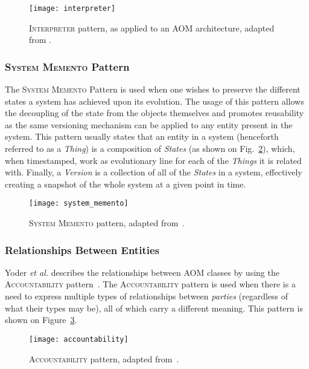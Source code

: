 \begin{figure}[H]
  \centering
  \texttt{[image: interpreter]}
  \caption{\textsc{Interpreter} pattern, as applied to an AOM architecture, adapted from \cite{gang_of_four}.}
  \label{fig:interpreter_pattern}
\end{figure}

\subsubsection{\textsc{System Memento} Pattern}\label{sec:system_memento_pattern}

The \textsc{System Memento} Pattern is used when one wishes to preserve the different states a system has achieved upon its evolution. The usage of this pattern allows the decoupling of the state from the objects themselves and promotes reusability as the same versioning mechanism can be applied to any entity present in the system. This pattern usually states that an entity in a system (henceforth referred to as a \emph{Thing}) is a composition of \emph{States} (as shown on Fig.~\ref{fig:system_memento}), which, when timestamped, work as evolutionary line for each of the \emph{Things} it is related with. Finally, a \emph{Version} is a collection of all of the \emph{States} in a system, effectively creating a snapshot of the whole system at a given point in time.

\begin{figure}[H]
  \centering
  \texttt{[image: system\_memento]}
  \caption{\textsc{System Memento} pattern, adapted from~\cite{patterns_data_and_metadata_evolution_in_aoms}.}
  \label{fig:system_memento}
\end{figure}

\subsubsection{Relationships Between Entities}\label{sec:relationships_between_entities}

Yoder \textit{et al.}\cite{YJ02} describes the relationships between AOM classes by using the \textsc{Accountability} pattern~\cite{fowler, hay}. The \textsc{Accountability} pattern is used when there is a need to express multiple types of relationships between \emph{parties} (regardless of what their types may be), all of which carry a different meaning\cite{fowler_accountability}. This pattern is shown on Figure~\ref{fig:accountability}.

\begin{figure}[H]
  \centering
  \texttt{[image: accountability]}
  \caption{\textsc{Accountability} pattern, adapted from~\cite{fowler_accountability}.}
  \label{fig:accountability}
\end{figure}


